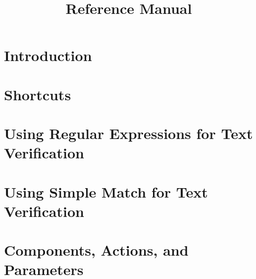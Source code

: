 
\title{Reference Manual}
\maketitle

\tableofcontents
\renewcommand{\bxcomment}[2]{}%
\clearpage

\chapter{Introduction}

\clearpage

\chapter{Shortcuts}

\clearpage

\chapter{Using Regular Expressions for Text Verification}
\label{regex}

\clearpage

\chapter{Using Simple Match for Text Verification}
\label{simplematch}

\clearpage

\chapter{Components, Actions, and Parameters}
 \label{actparam}
 
 \clearpage

